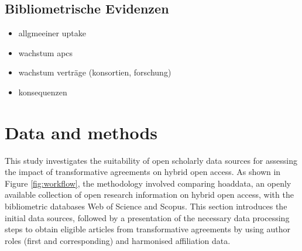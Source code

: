 \documentclass[a4paper,man,floatsintext,longtable,noextraspace,10pt]{apa6}
\providecommand{\tightlist}{%
  \setlength{\itemsep}{0pt}\setlength{\parskip}{0pt}}
\begin{document}
\subsection{Bibliometrische Evidenzen}\label{bibliometrische-evidenzen}

\begin{itemize}
\tightlist
\item
  allgmeeiner uptake
\item
  wachstum apcs
\item
  wachstum verträge (konsortien, forschung)
\item
  konsequenzen
\end{itemize}

\section{Data and methods}\label{data-and-methods}

This study investigates the suitability of open scholarly data sources
for assessing the impact of transformative agreements on hybrid open
access. As shown in Figure \ref{fig:workflow}, the methodology involved
comparing hoaddata, an openly available collection of open research
information on hybrid open access, with the bibliometric databases Web
of Science and Scopus. This section introduces the initial data sources,
followed by a presentation of the necessary data processing steps to
obtain eligible articles from transformative agreements by using author
roles (first and corresponding) and harmonised affiliation data.
\end{document}
